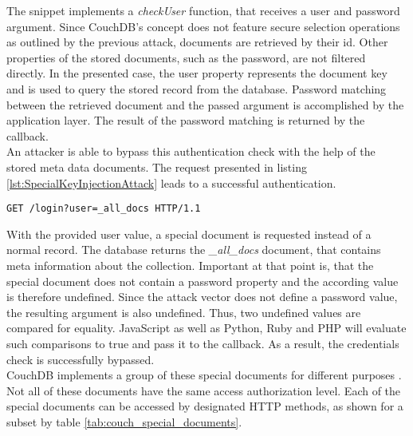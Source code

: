 The snippet implements a \emph{checkUser} function, that receives a user and password argument. Since CouchDB's concept does not feature secure selection operations as outlined by the previous attack, documents are retrieved by their id. Other properties of the stored documents, such as the password, are not filtered directly. In the presented case, the user property represents the document key and is used to query the stored record from the database. Password matching between the retrieved document and the passed argument is accomplished by the application layer. The result of the password matching is returned by the callback. \\

An attacker is able to bypass this authentication check with the help of the stored meta data documents. The request presented in listing \ref{lst:SpecialKeyInjectionAttack} leads to a successful authentication.
 
\begin{lstlisting}[caption={Attack vector against CouchDB for special key injection via the query-string parameter}, label={lst:SpecialKeyInjectionAttack}]
GET /login?user=_all_docs HTTP/1.1
\end{lstlisting}

With the provided user value, a special document is requested instead of a normal record. The database returns the \emph{\_all\_docs} document, that contains meta information about the collection. Important at that point is, that the special document does not contain a password property and the according value is therefore undefined. Since the attack vector does not define a password value, the resulting argument is also undefined. Thus, two undefined values are compared for equality. JavaScript as well as Python, Ruby and PHP will evaluate such comparisons to true and pass it to the callback. As a result, the credentials check is successfully bypassed.\\

CouchDB implements a group of these special documents for different purposes \cite{ASF2016}. Not all of these documents have the same access authorization level. Each of the special documents can be accessed by designated HTTP methods, as shown for a subset by table \ref{tab:couch_special_documents}. \\

